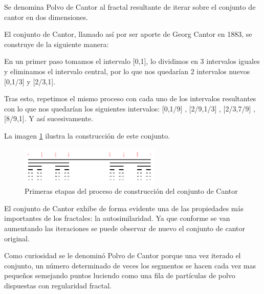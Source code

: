 \begin{definition}
Se denomina Polvo de Cantor al fractal resultante de iterar sobre el conjunto de cantor en dos dimensiones.
\end{definition}

\begin{definition}
El conjunto de Cantor, llamado así por ser aporte de Georg Cantor en 1883, se construye de la siguiente manera:

En un primer paso tomamos el intervalo [0,1], lo dividimos en 3 intervalos iguales y eliminamos el intervalo central, por lo que nos quedarían 2 intervalos nuevos [0,1/3] y [2/3,1].

Tras esto, repetimos el mismo proceso con cada uno de los intervalos resultantes con lo que nos quedarían los siguientes intervalos: [0,1/9] , [2/9,1/3] , [2/3,7/9] , [8/9,1]. Y así sucesivamente.

La imagen \ref{fig:conjuntoCantor} ilustra la construcción de este conjunto.
\end{definition}

\begin{figure}[hbtp]
\centering
\includegraphics[width = 0.6\textwidth]{img/conjuntoCantor.png}
\caption{Primeras etapas del proceso de construcción del conjunto de Cantor}
\label{fig:conjuntoCantor}
\end{figure}

El conjunto de Cantor exhibe de forma evidente una de las propiedades más importantes de los fractales: la autosimilaridad. Ya que conforme se van aumentando las iteraciones se puede observar de nuevo el conjunto de cantor original.

Como curiosidad se le denominó Polvo de Cantor porque una vez iterado el conjunto, un número determinado de veces los segmentos se hacen cada vez mas pequeños semejando puntos luciendo como una fila de partículas de polvo dispuestas con regularidad fractal.


